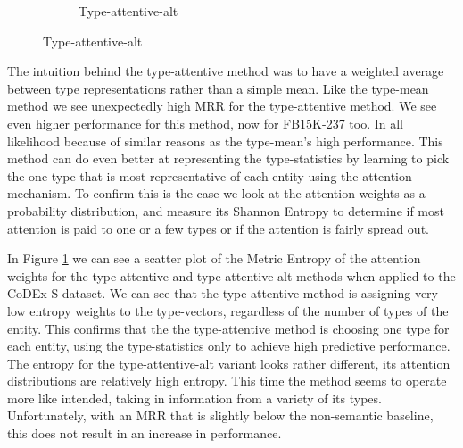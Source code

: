 \begin{figure}
\begin{subfigure}[b]{0.489\columnwidth}
        \caption{Type-attentive-alt}
    \end{subfigure}
    \label{fig:metric_entropy_vs_nr_types_attentive_codex_s}
\end{figure}

The intuition behind the type-attentive method was to have a weighted average between type representations rather than a simple mean. Like the type-mean method we see unexpectedly high MRR for the type-attentive method. We see even higher performance for this method, now for FB15K-237 too. In all likelihood because of similar reasons as the type-mean's high performance. This method can do even better at representing the type-statistics by learning to pick the one type that is most representative of each entity using the attention mechanism. To confirm this is the case we look at the attention weights as a probability distribution, and measure its Shannon Entropy to determine if most attention is paid to one or a few types or if the attention is fairly spread out.


%
In Figure \ref{fig:metric_entropy_vs_nr_types_attentive_codex_s} we can see a scatter plot of the Metric Entropy of the attention weights for the type-attentive and type-attentive-alt methods when applied to the CoDEx-S dataset. We can see that the type-attentive method is assigning very low entropy weights to the type-vectors, regardless of the number of types of the entity. This confirms that the the type-attentive method is choosing one type for each entity, using the type-statistics only to achieve high predictive performance.
%
The entropy for the type-attentive-alt variant looks rather different, its attention distributions are relatively high entropy.
This time the method seems to operate more like intended, taking in information from a variety of its types. Unfortunately, with an MRR that is slightly below the non-semantic baseline, this does not result in an increase in performance.


